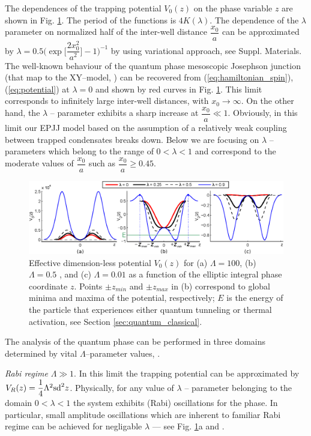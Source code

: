\documentclass[aps, pre, preprint, groupedaddress, superscriptaddress, showkeys, showpacs] {revtex4-1}
\begin{document}
The dependences of the trapping potential $V_0(z)$ on the phase variable $z$ are shown in Fig. \ref{pic:phase_potential}. The period of the functions is  $4K(\lambda)$.
The dependence of the $\lambda$ parameter on normalized half of the inter-well distance $\dfrac{x_0}{a}$ can be approximated by $\lambda = 0.5 \Big( \exp \Big[ \dfrac{2 x_0^2}{a^2} \Big] - 1 \Big)^{-1}$ by using variational approach,  see Suppl. Materials.
The well-known behaviour of the quantum phase mesoscopic Josephson junction (that map to the XY--model, \citep{Lago1, Lago2} ) can be recovered from (\ref{eq:hamiltonian_spin}), (\ref{eq:potential}) at $\lambda = 0$ and shown by red curves in Fig. \ref{pic:phase_potential}. This limit corresponds to  infinitely large inter-well distances, with $x_0 \to \infty$.
On the other hand, the $\lambda$ -- parameter exhibits a sharp increase at $\dfrac{x_0}{a} \ll 1$.
Obviously, in this limit our EPJJ model based on the assumption of a relatively weak coupling between trapped condensates breaks down.
Below we are focusing on $\lambda$ -- parameters which belong to the range of $0 < \lambda < 1$ and correspond to the moderate values of $\dfrac{x_0}{a}$ such as $\dfrac{x_0}{a} \geq 0.45$. 
%
\begin{figure}[ht]
\begin{center}\includegraphics[width=1\linewidth]{pic/potentials.eps}
\end{center}
\caption{
Effective dimension-less potential $V_0(z)$ for (a) $\Lambda = 100$, (b) $\Lambda = 0.5$ , and (c) $\Lambda = 0.01$ as a function of the elliptic integral phase coordinate $z$.
Points $\pm z_{min}$ and $\pm z_{max}$ in (b) correspond to global minima and maxima of the potential, respectively; $E$ is the energy of the particle that experiences either quantum tunneling or thermal activation, see Section \ref{sec:quantum_classical}.
\label{pic:phase_potential}}
\end{figure}
%
The analysis of the quantum phase can be performed in three domains determined by vital $\Lambda$--parameter values, \cite{Anglin}.

\textit{Rabi regime} $\Lambda \gg 1$. In this limit the trapping potential can be approximated by $V_R(z) = \dfrac{1}{4} \Lambda^2 \textrm{sd}^2{z}$.
Physically, for any value of $\lambda$ -- parameter belonging to the domain 0$<\lambda <1$ the system exhibits (Rabi) oscillations for the phase.
In particular, small amplitude oscillations which are inherent to familiar Rabi regime can be achieved for negligable $\lambda$ --- see Fig. \ref{pic:phase_potential}a and \cite{Anglin}.
\end{document}

